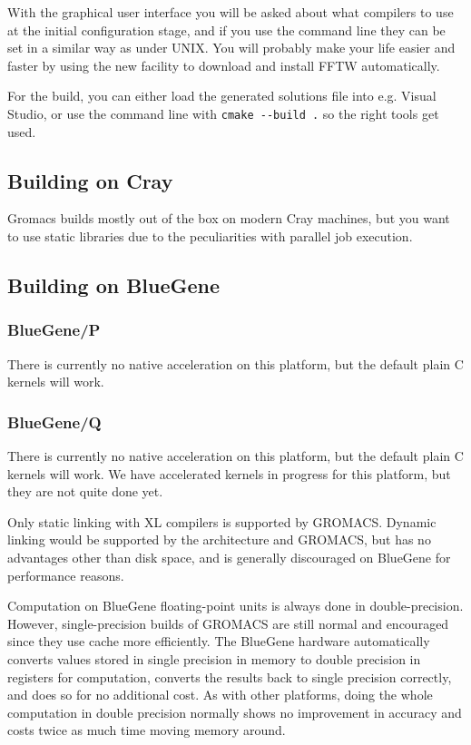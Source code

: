 \documentclass{article}[12pt,a4paper,twoside]
\newcommand{\gromacs}{GROMACS}
\newcommand{\fftw}{FFTW}
\begin{document}
With the graphical user interface you will be asked about what compilers
to use at the initial configuration stage, and if you use the command line
they can be set in a similar way as under UNIX.
You will probably make your life easier and faster by using the
new facility to download and install \fftw{} automatically. 

For the build, you can either load the generated solutions file into
e.g. Visual Studio, or use the command line with \verb+cmake --build .+ 
so the right tools get used.

\subsection{Building on Cray}

Gromacs builds mostly out of the box on modern Cray machines,
but you want to use static libraries due to the peculiarities with
parallel job execution.

\subsection{Building on BlueGene}

\subsubsection{BlueGene/P}

There is currently no native acceleration on this platform, but the
default plain C kernels will work.

\subsubsection{BlueGene/Q}

There is currently no native acceleration on this platform, but the
default plain C kernels will work. We have accelerated kernels in
progress for this platform, but they are not quite done yet.

Only static linking with XL compilers is supported by \gromacs{}. Dynamic
linking would be supported by the architecture and \gromacs{}, but has no
advantages other than disk space, and is generally discouraged on
BlueGene for performance reasons.

Computation on BlueGene floating-point units is always done in
double-precision. However, single-precision builds of \gromacs{} are
still normal and encouraged since they use cache more efficiently. 
The BlueGene hardware automatically
converts values stored in single precision in memory to double
precision in registers for computation, converts the results back to
single precision correctly, and does so for no additional cost. As
with other platforms, doing the whole computation in double precision
normally shows no improvement in accuracy and costs twice as much time
moving memory around.
\end{document}
